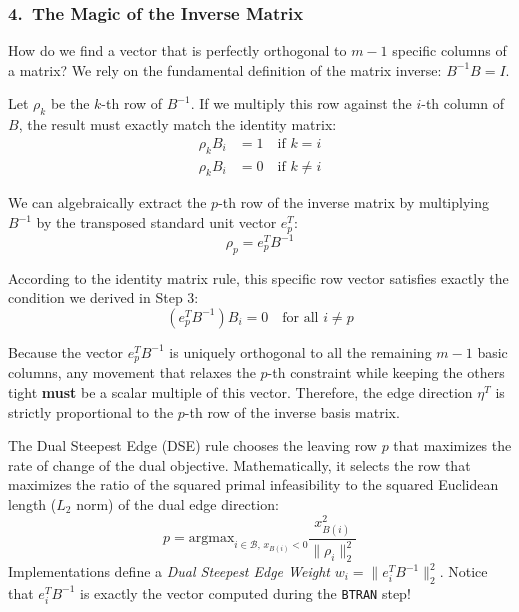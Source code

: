\documentclass[11pt, a4paper]{article}
\begin{document}
\subsubsection*{4.\ The Magic of the Inverse Matrix}

How do we find a vector that is perfectly orthogonal to $m-1$ specific columns of a matrix? We rely on the fundamental definition of the matrix inverse: $B^{-1} B = I$.

Let $\rho_k$ be the $k$-th row of $B^{-1}$. If we multiply this row against the $i$-th column of $B$, the result must exactly match the identity matrix:
\begin{align*}
\rho_k B_i &= 1 \quad \text{if } k = i \\
\rho_k B_i &= 0 \quad \text{if } k \neq i
\end{align*}

We can algebraically extract the $p$-th row of the inverse matrix by multiplying $B^{-1}$ by the transposed standard unit vector $e_p^T$:
\[
\rho_p = e_p^T B^{-1}
\]

According to the identity matrix rule, this specific row vector satisfies exactly the condition we derived in Step 3:
\[
(e_p^T B^{-1}) B_i = 0 \quad \text{for all } i \neq p
\]

\begin{note}
Because the vector $e_p^T B^{-1}$ is uniquely orthogonal to all the remaining $m-1$ basic columns, any movement that relaxes the $p$-th constraint while keeping the others tight \textbf{must} be a scalar multiple of this vector. Therefore, the edge direction $\eta^T$ is strictly proportional to the $p$-th row of the inverse basis matrix.
\end{note}

\begin{definition}
The Dual Steepest Edge (DSE) rule chooses the leaving row $p$ that maximizes the rate of change of the dual objective. Mathematically, it selects the row that maximizes the ratio of the squared primal infeasibility to the squared Euclidean length ($L_2$ norm) of the dual edge direction:
\[
p = \text{argmax}_{i \in \mathcal{B}, \, x_{B(i)} < 0} \frac{x_{B(i)}^2}{\|\rho_i\|_2^2}
\]
Implementations define a \emph{Dual Steepest Edge Weight} $w_i = \|e_i^T B^{-1}\|_2^2$. Notice that $e_i^T B^{-1}$ is exactly the vector computed during the \texttt{BTRAN} step!
\end{definition}

\end{document}
